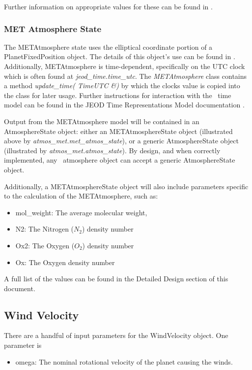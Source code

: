 Further information on appropriate values for these can be found in
\cite{Owens}.

\subsubsection{MET Atmosphere State}
The METAtmosphere state uses the elliptical coordinate portion of a
PlanetFixedPosition object. The details of this object's use can be found in
\cite{dynenv:PLANETFIXED}.
Additionally, METAtmosphere is time-dependent, specifically on the UTC
clock which is often found at \textit{jeod\_time.time\_utc}.
The \textit{METAtmosphere} class contains a method
\textit{update\_time( TimeUTC \&)} by which the clocks value is copied into
the class for later usage.
Further instructions for interaction with the
\JEODid\ time model can be found in
the JEOD Time Representations Model documentation
\cite{dynenv:TIME}.

Output from the METAtmosphere model will be contained in an AtmosphereState object:
either an METAtmosphereState object (illustrated above by
\textit{atmos\_met.met\_atmos\_state}), or a generic AtmosphereState object (illustrated
by \textit{atmos\_met.atmos\_state}). By design,
and when correctly implemented, any \JEODid\ atmosphere object can accept
a generic AtmosphereState object.

Additionally, a METAtmosphereState object will also include parameters specific to the
calculation of the METAtmosphere, such as:

\begin{itemize}
\item mol\_weight: The average molecular weight,
\item N2: The Nitrogen ($N_2$) density number
\item Ox2: The Oxygen ($O_2$) density number
\item Ox: The Oxygen density number
\end{itemize}

A full list of the values can be found in the Detailed Design
section of this document.

\subsection{Wind Velocity}

There are a handful of input parameters for the WindVelocity object. One parameter
is

\begin{itemize}
\item omega: The nominal rotational velocity of the planet causing the winds.
\end{itemize}

